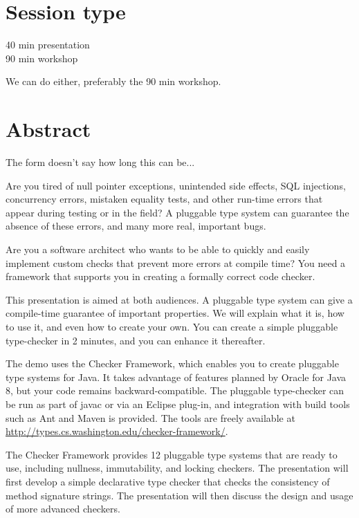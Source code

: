 \documentclass{article}
\begin{document}
\section{Session type}

40 min presentation\\
90 min workshop

We can do either, preferably the 90 min workshop.


\section{Abstract}

The form doesn't say how long this can be...

\medskip

Are you tired of null pointer exceptions, unintended side effects, SQL
injections, concurrency errors, mistaken equality tests, and other run-time
errors that appear during testing or in the field?  A pluggable type system
can guarantee the absence of these errors, and many more real, important
bugs.

Are you a software architect who wants to be able to quickly and easily
implement custom checks that prevent more errors at compile time?  You need
a framework that supports you in creating a formally correct code checker.

This presentation is aimed at both audiences.  A pluggable type system can
give a compile-time guarantee of important properties.  We will explain
what it is, how to use it, and even how to create your own.  You can create
a simple pluggable type-checker in 2 minutes, and you can enhance it
thereafter.

The demo uses the Checker Framework, which enables you to create pluggable
type systems for Java.
It takes advantage of features planned by Oracle for Java 8, but your code
remains backward-compatible.
The pluggable type-checker can be run as part of javac or via an Eclipse
plug-in, and integration with build tools such as Ant and Maven is
provided.
The tools are freely available at
\url{http://types.cs.washington.edu/checker-framework/}.

The Checker Framework provides 12 pluggable type systems that are
ready to use, including nullness, immutability, and
locking checkers.
The presentation will first develop a simple declarative type checker
that checks the consistency of method signature strings.
The presentation will then discuss the design and usage of more
advanced checkers.
\end{document}
